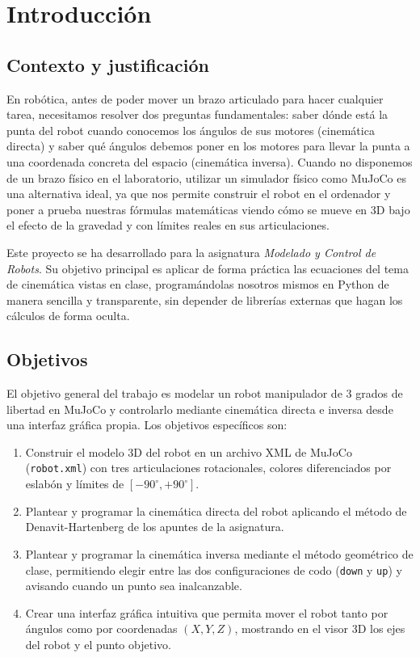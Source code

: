 \documentclass[11pt,a4paper]{article}
\begin{document}
\newpage
\tableofcontents
\newpage

\section{Introducción}

\subsection{Contexto y justificación}
En robótica, antes de poder mover un brazo articulado para hacer cualquier tarea, necesitamos resolver dos preguntas fundamentales: saber dónde está la punta del robot cuando conocemos los ángulos de sus motores (cinemática directa) y saber qué ángulos debemos poner en los motores para llevar la punta a una coordenada concreta del espacio (cinemática inversa). Cuando no disponemos de un brazo físico en el laboratorio, utilizar un simulador físico como MuJoCo es una alternativa ideal, ya que nos permite construir el robot en el ordenador y poner a prueba nuestras fórmulas matemáticas viendo cómo se mueve en 3D bajo el efecto de la gravedad y con límites reales en sus articulaciones.

Este proyecto se ha desarrollado para la asignatura \textit{Modelado y Control de Robots}. Su objetivo principal es aplicar de forma práctica las ecuaciones del tema de cinemática vistas en clase, programándolas nosotros mismos en Python de manera sencilla y transparente, sin depender de librerías externas que hagan los cálculos de forma oculta.

\subsection{Objetivos}
El objetivo general del trabajo es modelar un robot manipulador de 3 grados de libertad en MuJoCo y controlarlo mediante cinemática directa e inversa desde una interfaz gráfica propia. Los objetivos específicos son:
\begin{enumerate}
    \item Construir el modelo 3D del robot en un archivo XML de MuJoCo (\texttt{robot.xml}) con tres articulaciones rotacionales, colores diferenciados por eslabón y límites de $[-90^\circ, +90^\circ]$.
    \item Plantear y programar la cinemática directa del robot aplicando el método de Denavit-Hartenberg de los apuntes de la asignatura.
    \item Plantear y programar la cinemática inversa mediante el método geométrico de clase, permitiendo elegir entre las dos configuraciones de codo (\texttt{down} y \texttt{up}) y avisando cuando un punto sea inalcanzable.
    \item Crear una interfaz gráfica intuitiva que permita mover el robot tanto por ángulos como por coordenadas $(X, Y, Z)$, mostrando en el visor 3D los ejes del robot y el punto objetivo.
\end{enumerate}
\end{document}
